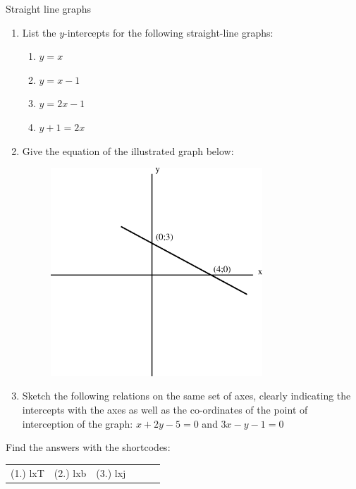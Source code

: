\begin{exercises}{Straight line graphs }
{
\nopagebreak
\label{m39338*id239994}\begin{enumerate}[noitemsep, label=\textbf{\arabic*}. ] 
\label{m39338*uid94}\item List the $y$-intercepts for the following straight-line graphs:
\label{m39338*id240020}\begin{enumerate}[noitemsep, label=\textbf{\alph*}. ] 
\label{m39338*uid95}\item $y=x$\label{m39338*uid96}\item $y=x-1$\label{m39338*uid97}\item $y=2x-1$\label{m39338*uid98}\item $y+1=2x$\end{enumerate}
  \label{m39338*uid99}\item Give the equation of the illustrated graph below:
\setcounter{subfigure}{0}
\begin{figure}[H] %
\begin{center}
\label{m39338*id240155!!!underscore!!!media}\label{m39338*id240155!!!underscore!!!printimage}\includegraphics[width=300px]{col11306.imgs/m39338_MG10C11_012.png} %
\vspace{2pt}
\vspace{.1in}
\end{center}
\end{figure}               \label{m39338*uid100}\item Sketch the following relations on the same set of axes, clearly indicating the intercepts with the axes as well as the co-ordinates of the point of interception of the graph:
$x+2y-5=0$ and $3x-y-1=0$\newline
\end{enumerate}
\label{m39338**end}
\par {} Find the answers with the shortcodes:
\par \begin{tabular}[h]{cccccc}
(1.) lxT  &  (2.) lxb  &  (3.) lxj  & \end{tabular}
}
\end{exercises}
